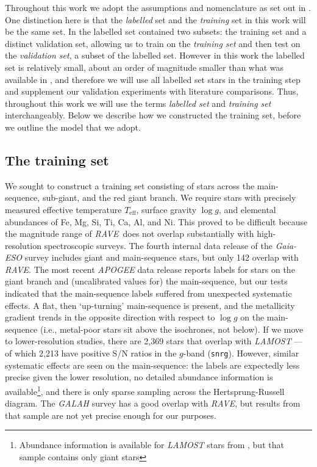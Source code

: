 \documentclass[preprint,trackchanges]{aastex}
\newcommand{\project}[1]{\textsl{#1}}
\newcommand{\acronym}[1]{{\small{#1}}}
\newcommand{\rave}{\project{\acronym{RAVE}}}
\newcommand{\logg}{\log g}
\newcommand{\teff}{T_{\mathrm{eff}}}
\begin{document}
Throughout this work we adopt the assumptions and nomenclature as set out in
\citet{Casey_2016b}.  One distinction here is that the \emph{labelled} set and
the \emph{training} set in this work will be the same set.  In \citet{Casey_2016b}
the labelled set contained two subsets: the training set and a distinct
validation set, allowing us to train on the \emph{training set} and then test
on the \emph{validation set}, a subset of the labelled set.  However in this work
the labelled set is relatively small, about an order of magnitude smaller than 
what was available in \citet{Casey_2016b}, and therefore we will use all labelled 
set stars in the training step and supplement our validation experiments with 
literature comparisons.  Thus, throughout this work we will use the terms 
\emph{labelled set} and \emph{training set} interchangeably.  Below we describe 
how we constructed the training set, before we outline the model that we adopt.


\subsection{The training set}
\label{sec:the-training-set}

We sought to construct a training set consisting of stars across the main-sequence,
sub-giant, and the red giant branch.  We require stars with precisely measured
effective temperature $\teff$, surface gravity $\logg$, and elemental abundances
of Fe, Mg, Si, Ti, Ca, Al, and Ni.  This proved to be difficult because the magnitude
range of \rave\ does not overlap substantially with high-resolution spectroscopic
surveys.  The fourth internal data release of the \project{Gaia-ESO} survey includes 
giant and main-sequence stars, but only 142 overlap with \rave.  The most recent 
\project{APOGEE} data release \citep{sloan_dr13} reports labels for stars on the
giant branch and (uncalibrated values for) the main-sequence, but our tests indicated
that the main-sequence labels suffered from unexpected systematic effects.  A flat, 
then `up-turning' main-sequence is present, and the metallicity gradient trends in 
the opposite direction with respect to $\logg$ on the main-sequence (i.e., metal-poor
stars sit above the isochrones, not below).  If we move to lower-resolution studies,
there are 2,369 stars that overlap with \project{LAMOST} --- of which 2,213 have positive
S/N ratios in the $g$-band (\texttt{snrg}).  However, similar systematic effects are 
seen on the main-sequence: the labels are expectedly less precise given the lower
resolution, no detailed abundance information is available\footnote{Abundance 
information is available for \project{LAMOST} stars from \citet{Ho_2016}, but that 
sample contains only giant stars}, and there is only sparse sampling across the 
Hertsprung-Russell diagram.  The \project{GALAH} survey has a good overlap with \rave,
but results from that sample are not yet precise enough for our purposes.
\end{document}
